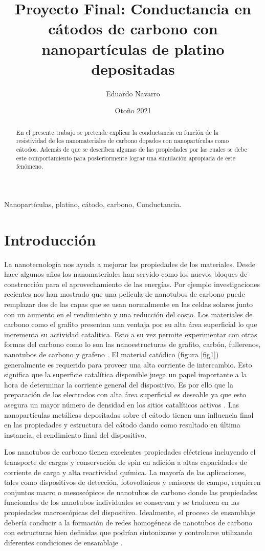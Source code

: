 \documentclass{elsarticle}
\title{Proyecto Final: Conductancia en cátodos de carbono con nanopartículas de platino depositadas \tnoteref{t1}}
\author{Eduardo Navarro}
\date{Otoño 2021}
\begin{document}
\begin{abstract}
En el presente trabajo se pretende explicar la conductancia en función de la resistividad de los nanomateriales de carbono dopados con nanopartículas como cátodos. Además de que se describen algunas de las propiedades por las cuales se debe este comportamiento para posteriormente lograr una simulación apropiada de este fenómeno.  
\end{abstract}

\begin{keyword}
Nanopartículas, platino, cátodo, carbono, Conductancia. 
\end{keyword}

\maketitle


\section{Introducción}

La nanotecnología nos ayuda a mejorar las propiedades de los materiales. Desde hace algunos años los nanomateriales han servido como los nuevos bloques de construcción para el aprovechamiento de las energías. Por ejemplo investigaciones recientes nos han mostrado que una película de nanotubos de carbono puede remplazar dos de las capas que se usan normalmente en las celdas solares junto con un aumento en el rendimiento y una reducción del costo. Los materiales de carbono como el grafito presentan una ventaja por su alta área superficial lo que incrementa su actividad catalítica. Esto a su vez permite experimentar con otras formas del carbono como lo son las nanoestructuras de grafito, carbón, fullerenos, nanotubos de carbono y grafeno \cite{calandraimg}.  El material catódico (figura \ref{fig1}) generalmente es requerido para proveer una alta corriente de intercambio. Esto significa que la superficie catalítica disponible juega un papel importante a la hora de determinar la corriente general del dispositivo. Es por ello que la preparación de los electrodos con alta área superficial es deseable ya que esto asegura un mayor número de densidad en los sitios catalíticos activos \cite{calandraimg}. Las nanopartículas metálicas depositadas sobre el cátodo tienen una influencia final en las propiedades y estructura del cátodo dando como resultado en última instancia, el rendimiento final del dispositivo.

Los nanotubos de carbono tienen excelentes propiedades eléctricas incluyendo el transporte de cargas y conservación de spin en adición a altas capacidades de corriente de carga y alta reactividad química. La mayoría de las aplicaciones, tales como dispositivos de detección, fotovoltaicos y emisores de campo, requieren conjuntos macro o mesoscópicos de nanotubos de carbono donde las propiedades funcionales de los nanotubos individuales se conservan y se traducen en las propiedades macroscópicas del dispositivo. Idealmente, el proceso de ensamblaje debería conducir a la formación de redes homogéneas de nanotubos de carbono con estructuras bien definidas que podrían sintonizarse y controlarse utilizando diferentes condiciones de ensamblaje \cite{Marshgrap}.
\end{document}
